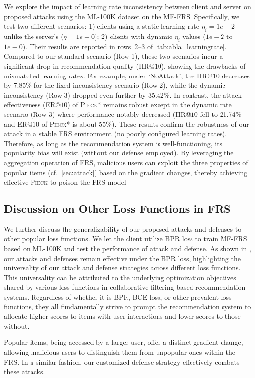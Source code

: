 We explore the impact of learning rate inconsistency between client and server on proposed attacks using the ML-100K dataset on the MF-FRS. Specifically, we test two different scenarios: 
1) clients using a static learning rate $\eta_i=1e-2$ unlike the server's ($\eta=1e-0$); 
2) clients with dynamic $\eta_i$ values ($1e-2$ to $1e-0$). Their results are reported in rows~2--3 of \cref{tab:abla_learningrate}.
Compared to our standard scenario (Row 1), these two scenarios incur a significant drop in recommendation quality (HR@$10$), showing the drawbacks of mismatched learning rates. 
For example, under `NoAttack', the HR@$10$ decreases by 7.85\% for the fixed inconsistency scenario (Row 2), while the dynamic inconsistency (Row 3) dropped even further by 35.42\%.
In contrast, the attack effectiveness (ER@$10$) of \textsc{Pieck*} remains robust except in the dynamic rate scenario (Row 3) where performance notably decreased (HR@$10$ fell to 21.74\% and ER@$10$ of \textsc{Pieck*} is about 55\%).
These results confirm the robustness of our attack in a stable FRS environment (no poorly configured learning rates).
Therefore, as long as the recommendation system is well-functioning, its popularity bias will exist (without our defense employed). By leveraging the aggregation operation of FRS, malicious users can exploit the three properties of popular items (cf.\ \cref{sec:attack}) based on the gradient changes, thereby achieving effective \textsc{Pieck} to poison the FRS model.

\subsection{Discussion on Other Loss Functions in FRS} 

We further discuss the generalizability of our proposed attacks and defenses to other popular loss functions.
We let the client utilize BPR loss \cite{BPR} to train MF-FRS based on ML-100K and test the performance of attack and defense.
As shown in , our attacks and defenses remain effective under the BPR loss, highlighting the  universality of our attack and defense strategies across different loss functions.
This universality can be attributed to the underlying optimization objectives shared by various loss functions in collaborative filtering-based recommendation systems.
Regardless of whether it is BPR, BCE loss, or other prevalent loss functions, they all fundamentally strive to prompt the recommendation system to allocate higher scores to items with user interactions and lower scores to those without.

Popular items, being accessed by a larger user, offer a distinct gradient change, allowing malicious users to distinguish them from unpopular ones within the FRS.
In a similar fashion, our customized defense strategy effectively combats these attacks.
% 



